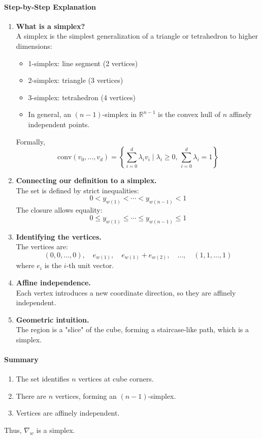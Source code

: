 \documentclass[12pt]{article}
\theoremstyle{definition}
\numberwithin{equation}{subsection}
\begin{document}
\paragraph{Step-by-Step Explanation}
\begin{enumerate}
    \item \textbf{What is a simplex?} \\
    A simplex is the simplest generalization of a triangle or tetrahedron to higher dimensions:
    \begin{itemize}
        \item 1-simplex: line segment (2 vertices)
        \item 2-simplex: triangle (3 vertices)
        \item 3-simplex: tetrahedron (4 vertices)
        \item In general, an $(n-1)$-simplex in $\mathbb{R}^{n-1}$ is the convex hull of $n$ affinely independent points.
    \end{itemize}
    Formally,
    \[
    \text{conv}(v_0, \ldots, v_d) = \left\{ \sum_{i=0}^d \lambda_i v_i \mid \lambda_i \ge 0,\, \sum_{i=0}^d \lambda_i = 1 \right\}
    \]
    \item \textbf{Connecting our definition to a simplex.} \\
    The set is defined by strict inequalities:
    \[
    0 < y_{w(1)} < \cdots < y_{w(n-1)} < 1
    \]
    The closure allows equality:
    \[
    0 \leq y_{w(1)} \leq \cdots \leq y_{w(n-1)} \leq 1
    \]
    \item \textbf{Identifying the vertices.} \\
    The vertices are:
    \[
    (0,0,\dots,0),\quad e_{w(1)},\quad e_{w(1)}+e_{w(2)},\quad \dots,\quad (1,1,\dots,1)
    \]
    where $e_i$ is the $i$-th unit vector.
    \item \textbf{Affine independence.} \\
    Each vertex introduces a new coordinate direction, so they are affinely independent.
    \item \textbf{Geometric intuition.} \\
    The region is a "slice" of the cube, forming a staircase-like path, which is a simplex.
\end{enumerate}

\paragraph{Summary}
\begin{enumerate}
    \item The set identifies $n$ vertices at cube corners.
    \item There are $n$ vertices, forming an $(n-1)$-simplex.
    \item Vertices are affinely independent.
\end{enumerate}
Thus, $\nabla_w$ is a simplex.
\end{document}
